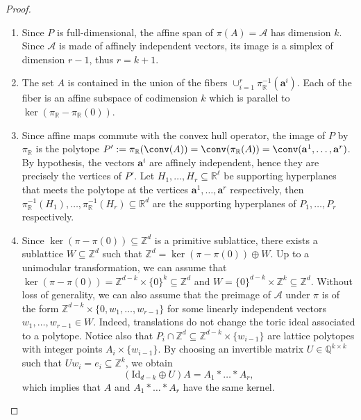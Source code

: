 \documentclass[12pt,reqno]{amsart}   	%
\theoremstyle{plain}
\theoremstyle{definition}
\theoremstyle{remark}
\newcommand{\Z}{\mathbb{Z}}
\newcommand{\R}{\mathbb{R}}
\begin{document}
\begin{proof}
    \begin{enumerate} 
        \item Since $P$ is full-dimensional, the affine span of $\pi(A)  = \mathcal{A}$ has dimension $k$. Since $\mathcal{A}$ is made of affinely independent vectors, its image is  a simplex of dimension $r-1$, thus $r = k+1$. 
\item The set $A$ is contained in the union of the fibers $\cup_{i=1}^r\pi^{-1}_{\R}(\mathbf{a}^i)$. Each of the fiber is an affine subspace of codimension $k$ which is parallel to $\ker (\pi_{\R} - \pi_{\R}(0))$. 
        \item Since affine maps commute with the convex hull operator, the image of $P$ by $\pi_{\R}$ is the polytope $P':= \pi_{\mathbb{R}}(\conv(A)) =\conv(\pi_{\mathbb{R}}(A)) = \conv(\mathbf{a}^1,\dots,\mathbf{a}^r)$. By hypothesis, the vectors $\mathbf{a}^i$ are affinely independent, hence they are precisely the vertices of $P'$. Let $H_1,\dots,H_r \subseteq \R^\ell$ be supporting hyperplanes that meets the polytope at the vertices $\mathbf{a}^1,\dots,\mathbf{a}^r$ respectively, then $\pi^{-1}_{\R}(H_1),\dots,\pi^{-1}_{\R}(H_{r}) \subseteq \R^d$ are the supporting hyperplanes of $P_1,\dots,P_r$ respectively. 
        \item Since $\ker (\pi-\pi(0)) \subseteq \Z^d$ is a primitive sublattice, there exists a sublattice $W \subseteq \Z^d$ such that $\Z^d = \ker (\pi-\pi(0)) \oplus W$. Up to a unimodular transformation, we can assume that $\ker (\pi-\pi(0)) = \Z^{d-k} \times \{0\}^k \subseteq \Z^d$ and $W= \{0\}^{d-k} \times \Z^k \subseteq \Z^d$. Without loss of generality, we can also assume that the preimage of $\mathcal{A}$ under $\pi$ is of the form $\Z^{d-k}\times \{0,w_1,\dots,w_{r-1}\}$ for some linearly independent vectors $w_1,\dots,w_{r-1} \in W$. Indeed, translations do not change the toric ideal associated to a polytope. Notice also that $P_i \cap \Z^d \subseteq \Z^{d-k} \times \{w_{i-1}\}$ are lattice polytopes with integer points $A_i \times \{w_{i-1}\}$. By choosing an invertible matrix $U \in \mathbb{Q}^{k \times k}$ such that $Uw_i = e_i \subseteq \Z^k$, we obtain 
        \[
        (\mathrm{Id}_{{d-k}} \oplus U) A = A_1*\dots*A_r,
        \]
        which implies that $A$ and $A_1*\dots*A_r$ have the same kernel. \qedhere
    \end{enumerate}
\end{proof}
\end{document}
